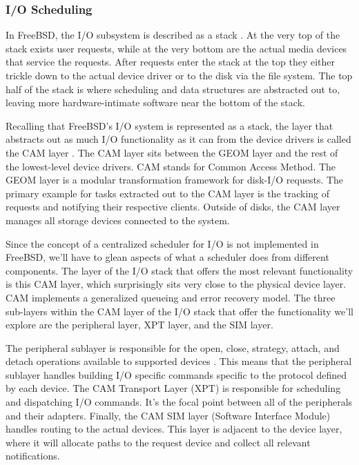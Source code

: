 \documentclass[10pt,draftclsnofoot,onecolumn]{IEEEtran}
\begin{document}
\subsubsection{I/O Scheduling}
\label{sub:IOScheduling FreeBSD}
In FreeBSD, the I/O subsystem is described as a stack \cite{bsd:2}.
At the very top of the stack exists user requests, while at the very bottom are the actual media devices that service the requests.
After requests enter the stack at the top they either trickle down to the actual device driver or to the disk via the file system.
The top half of the stack is where scheduling and data structures are abstracted out to, leaving more hardware-intimate software near the bottom of the stack.

\par Recalling that FreeBSD's I/O system is represented as a stack, the layer that abstracts out as much I/O functionality as it can from the device drivers is called the CAM layer \cite{bsd:1}.
The CAM layer sits between the GEOM layer and the rest of the lowest-level device drivers.
CAM stands for Common Access Method.
The GEOM layer is a modular transformation framework for disk-I/O requests.
The primary example for tasks extracted out to the CAM layer is the tracking of requests and notifying their respective clients.
Outside of disks, the CAM layer manages all storage devices connected to the system.

\par Since the concept of a centralized scheduler for I/O is not implemented in FreeBSD, we'll have to glean aspects of what a scheduler does from different components.
The layer of the I/O stack that offers the most relevant functionality is this CAM layer, which surprisingly sits very close to the physical device layer.
CAM implements a generalized queueing and error recovery model.
The three sub-layers within the CAM layer of the I/O stack that offer the functionality we'll explore are the peripheral layer, XPT layer, and the SIM layer.

\par The peripheral sublayer is responsible for the open, close, strategy, attach, and detach operations available to supported devices \cite{bsd:1}.
This means that the peripheral sublayer handles building I/O specific commands specific to the protocol defined by each device.
The CAM Transport Layer (XPT) is responsible for scheduling and dispatching I/O commands.
It's the focal point between all of the peripherals and their adapters.
Finally, the CAM SIM layer (Software Interface Module) handles routing to the actual devices.
This layer is adjacent to the device layer, where it will allocate paths to the request device and collect all relevant notifications.\\
\end{document}
